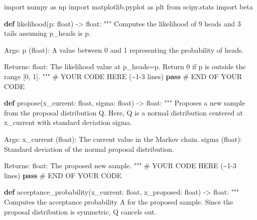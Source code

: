 \documentclass[
  letterpaper,
  numbers=noenddot,
  DIV=11]{scrreprt}
\newenvironment{Shaded}{\begin{snugshade}}{\end{snugshade}}
\newcommand{\BuiltInTok}[1]{\textcolor[rgb]{0.00,0.23,0.31}{#1}}
\newcommand{\CommentTok}[1]{\textcolor[rgb]{0.37,0.37,0.37}{#1}}
\newcommand{\ControlFlowTok}[1]{\textcolor[rgb]{0.00,0.23,0.31}{\textbf{#1}}}
\newcommand{\ImportTok}[1]{\textcolor[rgb]{0.00,0.46,0.62}{#1}}
\newcommand{\KeywordTok}[1]{\textcolor[rgb]{0.00,0.23,0.31}{\textbf{#1}}}
\newcommand{\NormalTok}[1]{\textcolor[rgb]{0.00,0.23,0.31}{#1}}
\newcommand{\OperatorTok}[1]{\textcolor[rgb]{0.37,0.37,0.37}{#1}}
\newcommand{\RegionMarkerTok}[1]{\textcolor[rgb]{0.00,0.23,0.31}{#1}}
\theoremstyle{definition}
\theoremstyle{plain}
\theoremstyle{plain}
\theoremstyle{remark}
\begin{document}
\begin{tcolorbox}[colframe=.grey, title=\faCode \enspace Code]

\begin{Shaded}
\begin{Highlighting}[numbers=left,,]
\ImportTok{import}\NormalTok{ numpy }\ImportTok{as}\NormalTok{ np}
\ImportTok{import}\NormalTok{ matplotlib.pyplot }\ImportTok{as}\NormalTok{ plt}
\ImportTok{from}\NormalTok{ scipy.stats }\ImportTok{import}\NormalTok{ beta}

\KeywordTok{def}\NormalTok{ likelihood(p: }\BuiltInTok{float}\NormalTok{) }\OperatorTok{{-}\textgreater{}} \BuiltInTok{float}\NormalTok{:}
    \CommentTok{"""}
\CommentTok{    Computes the likelihood of 9 heads and 3 tails assuming p\_heads is p.}

\CommentTok{    Args:}
\CommentTok{    p (float): A value between 0 and 1 representing the probability of heads.}

\CommentTok{    Returns:}
\CommentTok{    float: The likelihood value at p\_heads=p. Return 0 if p is outside the range [0, 1].}
\CommentTok{    """}
    \CommentTok{\# YOUR CODE HERE (\textasciitilde{}1{-}3 lines)}
    \ControlFlowTok{pass}
    \CommentTok{\# }\RegionMarkerTok{END}\CommentTok{ OF YOUR CODE}


\KeywordTok{def}\NormalTok{ propose(x\_current: }\BuiltInTok{float}\NormalTok{, sigma: }\BuiltInTok{float}\NormalTok{) }\OperatorTok{{-}\textgreater{}} \BuiltInTok{float}\NormalTok{:}
    \CommentTok{"""}
\CommentTok{    Proposes a new sample from the proposal distribution Q.}
\CommentTok{    Here, Q is a normal distribution centered at x\_current with standard deviation sigma.}

\CommentTok{    Args:}
\CommentTok{    x\_current (float): The current value in the Markov chain.}
\CommentTok{    sigma (float): Standard deviation of the normal proposal distribution.}

\CommentTok{    Returns:}
\CommentTok{    float: The proposed new sample.}
\CommentTok{    """}
    \CommentTok{\# YOUR CODE HERE (\textasciitilde{}1{-}3 lines)}
    \ControlFlowTok{pass}
    \CommentTok{\# }\RegionMarkerTok{END}\CommentTok{ OF YOUR CODE}


\KeywordTok{def}\NormalTok{ acceptance\_probability(x\_current: }\BuiltInTok{float}\NormalTok{, x\_proposed: }\BuiltInTok{float}\NormalTok{) }\OperatorTok{{-}\textgreater{}} \BuiltInTok{float}\NormalTok{:}
    \CommentTok{"""}
\CommentTok{    Computes the acceptance probability A for the proposed sample.}
\CommentTok{    Since the proposal distribution is symmetric, Q cancels out.}


\end{Highlighting}
\end{Shaded}
\end{tcolorbox}
\end{document}
